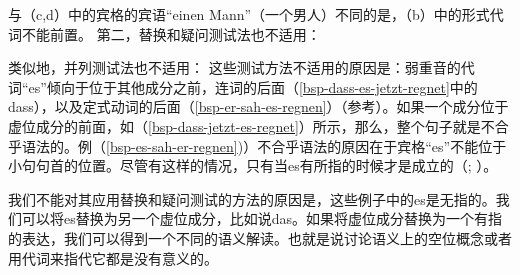 \zl
与（c,d）中的宾格的宾语“einen Mann”（一个男人）不同的是，（b）中的形式代词不能前置。
第二，替换和疑问测试法也不适用：
\eal
{}
\zl

\noindent
类似地，并列测试法也不适用：
\z
这些测试方法不适用的原因是：弱重音的代词“es”倾向于位于其他成分之前，连词的后面（\ref{bsp-dass-es-jetzt-regnet}中的dass），以及定式动词的后面（\ref{bsp-er-sah-es-regnen}）（参考\citealp[]{Abraham95a-u}）。如果一个成分位于虚位成分的前面，如（\ref{bsp-dass-jetzt-es-regnet}）所示，那么，整个句子就是不合乎语法的。例（\ref{bsp-es-sah-er-regnen})）不合乎语法的原因在于宾格“es”不能位于小句句首的位置。尽管有这样的情况，只有当es有所指的时候才是成立的（\citealt[]{Lenerz94a};
\citealp[]{GS97a}）。

我们不能对其应用替换和疑问测试的方法的原因是，这些例子中的es是无指的。我们可以将es替换为另一个虚位成分，比如说das。如果将虚位成分替换为一个有指的表达，我们可以得到一个不同的语义解读。也就是说讨论语义上的空位概念或者用代词来指代它都是没有意义的。

